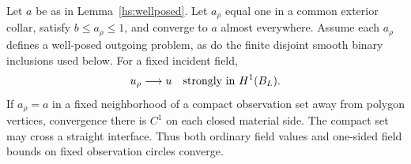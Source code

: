 \begin{lemma}
\label{hs:rounding-convergence}
Let $a$ be as in Lemma~\ref{hs:wellposed}.  Let $a_\rho$ equal one
in a common exterior collar, satisfy $b\leq a_\rho\leq1$, and
converge to $a$ almost everywhere.  Assume each $a_\rho$ defines a
well-posed outgoing problem, as do the finite disjoint smooth binary
inclusions used below.  For a fixed incident field,
\begin{equation}
 u_\rho\longrightarrow u\quad\hbox{strongly in }H^1(B_L).
 \label{hs:h1-convergence}
\end{equation}
If $a_\rho=a$ in a fixed neighborhood of a compact observation set
away from polygon vertices, convergence there is $C^1$ on each
closed material side.  The compact set may cross a straight
interface.  Thus both ordinary field values and one-sided field
bounds on fixed observation circles converge.
\end{lemma}

